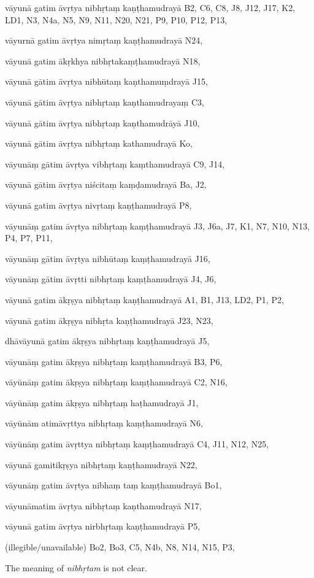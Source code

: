   \begin{marma}[hp02_026]


\item[vāyunā gatim āvṛtya nibhṛtaṃ kaṇṭhamudrayā] B2, C6, C8, J8, J12, J17, K2, LD1, N3, N4a, N5, N9, N11, N20, N21, P9, P10, P12, P13, 
\item[vāyurnā gatim āvṛtya nimṛtaṃ kaṇṭhamudrayā] N24,
\item[vāyunā gatim ākṛkhya nibhṛtakaṃṭhamudrayā] N18,
\item[vāyunā gātim āvṛtya nibhūtaṃ kaṇthamuṃdrayā] J15,
\item[vāyunā gātim āvṛtya nibhṛtaṃ kaṇthamudrayaṃ] C3,
\item[vāyunā gātim āvṛtya nibhṛtaṃ kaṇthamudrāyā] J10,
\item[vāyunā gātim āvṛtya nibhṛtaṃ kathamudrayā] Ko,
\item[vāyunāṃ gātim āvṛtya vibhṛtaṃ kaṃthamudrayā] C9, J14, 
\item[vāyunā gātim āvṛtya niścitaṃ kaṃḍamudrayā] Ba, J2, 
\item[vāyunā gatim āvṛtya nivṛtaṃ kaṇṭhamudrayā] P8,
\item[vāyunāṃ gatim āvṛtya nibhṛtaṃ kaṃṭhamudrayā] J3, J6a, J7, K1, N7, N10, N13, P4, P7, P11, 
\item[vāyunāṃ gātim āvṛtya nibhūtaṃ kaṃṭhamudrayā] J16,
\item[vāyunāṃ gātim āvṛtti nibhṛtaṃ kaṃṭhamudrayā] J4, J6,
\item[vāyunā gatim ākṛṣya nibhṛtaṃ kaṇṭhamudrayā] A1, B1, J13, LD2, P1, P2, 
\item[vāyunā gatim ākṛṣya nibhṛta kaṇṭhamudrayā] J23, N23,
\item[dhāvāyunā gatim ākṛṣya nibhṛtaṃ kaṇṭhamudrayā] J5,
\item[vāyunāṃ gatim ākṛṣya nibhṛtaṃ kaṃṭhamudrayā] B3, P6, 
\item[vāyūnāṃ gatim ākṛṣya nibhṛtaṃ kaṃṭhamudrayā] C2, N16,
\item[vāyūnāṃ gatim ākṛṣya nibhṛtaṃ haṭhamudrayā] J1,
\item[vāyūnām atimāvṛttya nibhṛtaṃ kaṃṭhamudrayā] N6,
\item[vāyūnāṃ gatim āvṛttya nibhṛtaṃ kaṃṭhamudrayā] C4, J11, N12, N25, 
\item[vāyunā gamitikṛṣya nibhṛtaṃ kaṇṭhamudrayā] N22,
\item[vāyunāṃ gatim āvṛtya nibhaṃ taṃ kaṃṭhamudrayā] Bo1, 
\item[vāyunāmatim āvṛtya nibhṛtaṃ kaṇthamudrayā] N17,
\item[vāyunā gatim āvṛtya nirbhṛtaṃ kaṇṭhamudrayā] P5,
\item[(illegible/unavailable)] Bo2, Bo3, C5, N4b, N8, N14, N15, P3,

    \begin{description}
      The meaning of \emph{nibhṛtam} is not clear. 
    \end{description}

  \end{marma}


